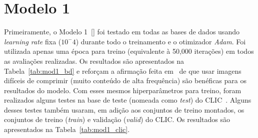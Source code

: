 \section{Modelo 1}
\label{res:mod1}
Primeiramente, o Modelo 1~[] foi testado em todas as bases de dados usando \textit{learning rate} fixa ($10^-4$) durante todo o treinamento e o otimizador \textit{Adam}. Foi utilizada apenas uma época para treino (equivalente à 50,000 iterações) em todos as avaliações realizadas. Os resultados são apresentados na Tabela~\ref{tab:mod1_bd} e reforçam a afirmação feita em~\cite{toderici2017} de que usar imagens difíceis de comprimir (muito conteúdo de alta frequência) são benéficas para os resultados do modelo. Com esses mesmos hiperparâmetros para treino, foram realizados alguns testes na base de teste (nomeada como \textit{test}) do \acrshort{CLIC}~\cite{clic}. Alguns desses testes também usaram, em adição aos conjuntos de treino montados, os conjuntos de treino (\textit{train}) e validação (\textit{valid}) do \acrshort{CLIC}. Os resultados são apresentados na Tabela~\ref{tab:mod1_clic}.

